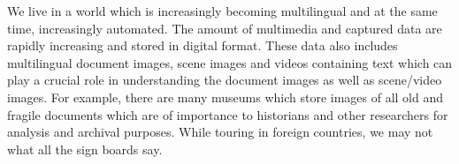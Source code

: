 %
%
%
%
%
%
%
%
%
%
%

We live in a world which is increasingly becoming multilingual and at the same time, increasingly automated. The amount of multimedia and captured data are rapidly increasing and stored in digital format. These data also includes multilingual document images, scene images and videos containing text which can play a crucial role in understanding the document images as well as scene/video images. 
For example, there are many museums which store images of all old and fragile documents which are of importance to historians and other researchers for analysis and archival purposes. While touring in foreign countries, we may not what all the sign boards say. 

